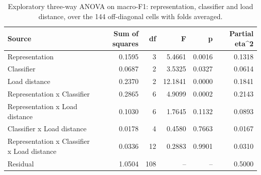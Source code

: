 \begin{table}[htbp]
\centering
\caption{Exploratory three-way ANOVA on macro-F1: representation, classifier and load distance, over the 144 off-diagonal cells with folds averaged.}
\label{tab:anova3}
\begin{tabular}{lrrrrr}
\toprule
Source & Sum of squares & df & F & p & Partial eta\textasciicircum{}2 \\
\midrule
Representation & 0.1595 & 3 & 5.4661 & 0.0016 & 0.1318 \\
Classifier & 0.0687 & 2 & 3.5325 & 0.0327 & 0.0614 \\
Load distance & 0.2370 & 2 & 12.1841 & 0.0000 & 0.1841 \\
Representation x Classifier & 0.2865 & 6 & 4.9099 & 0.0002 & 0.2143 \\
Representation x Load distance & 0.1030 & 6 & 1.7645 & 0.1132 & 0.0893 \\
Classifier x Load distance & 0.0178 & 4 & 0.4580 & 0.7663 & 0.0167 \\
Representation x Classifier x Load distance & 0.0336 & 12 & 0.2883 & 0.9901 & 0.0310 \\
Residual & 1.0504 & 108 & -- & -- & 0.5000 \\
\bottomrule
\end{tabular}
\end{table}
